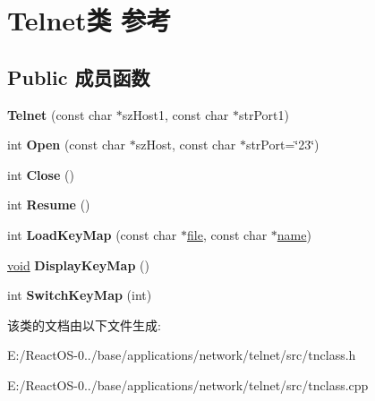 \hypertarget{class_telnet}{}\section{Telnet类 参考}
\label{class_telnet}
\subsection*{Public 成员函数}
\begin{DoxyCompactItemize}
\item 
\mbox{\label{class_telnet_ab9577498b44c8a2b3806ae83fadde385}} 
{\bfseries Telnet} (const char $\ast$sz\+Host1, const char $\ast$str\+Port1)
\item 
\mbox{\label{class_telnet_a9c8a1d42646d56fabb13f183b5cb451b}} 
int {\bfseries Open} (const char $\ast$sz\+Host, const char $\ast$str\+Port=\char`\"{}23\char`\"{})
\item 
\mbox{\label{class_telnet_a307d4da3eaa9242fbfe0c38e2402e414}} 
int {\bfseries Close} ()
\item 
\mbox{\label{class_telnet_a227b83e0cab40c04c1e472d362ea002e}} 
int {\bfseries Resume} ()
\item 
\mbox{\label{class_telnet_a5399306c2b855d0e2233c6d1eea98fc0}} 
int {\bfseries Load\+Key\+Map} (const char $\ast$\hyperlink{structfile}{file}, const char $\ast$\hyperlink{structname}{name})
\item 
\mbox{\label{class_telnet_ab3bdc2859138708ab36c3c9df88b2c9b}} 
\hyperlink{interfacevoid}{void} {\bfseries Display\+Key\+Map} ()
\item 
\mbox{\label{class_telnet_a098a9f62d87eecb0443a13ab7eb24f47}} 
int {\bfseries Switch\+Key\+Map} (int)
\end{DoxyCompactItemize}


该类的文档由以下文件生成\+:\begin{DoxyCompactItemize}
\item 
E\+:/\+React\+O\+S-\/0../base/applications/network/telnet/src/tnclass.\+h\item 
E\+:/\+React\+O\+S-\/0../base/applications/network/telnet/src/tnclass.\+cpp\end{DoxyCompactItemize}
